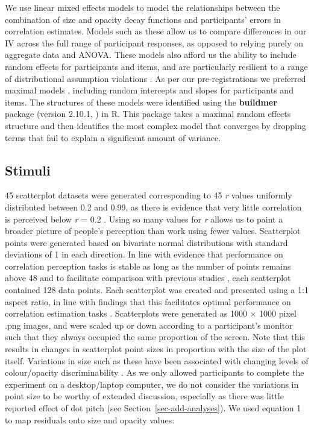 \documentclass[sigconf]{acmart}
\begin{document}
We use linear mixed effects models to model the relationships between
the combination of size and opacity decay functions and participants'
errors in correlation estimates. Models such as these allow us to
compare differences in our IV across the full range of participant
responses, as opposed to relying purely on aggregate data and ANOVA.
These models also afford us the ability to include random effects for
participants and items, and are particularly resilient to a range of
distributional assumption violations \citep{schielzeth_2020}. As per our
pre-registrations we preferred maximal models \citep{barr_2013},
including random intercepts and slopes for participants and items. The
structures of these models were identified using the \textbf{buildmer}
package (version 2.10.1, \citep{voeten_buildmer}) in R. This package
takes a maximal random effects structure and then identifies the most
complex model that converges by dropping terms that fail to explain a
significant amount of variance.

\hypertarget{sec-scatter-gen}{%
\subsection{Stimuli}\label{sec-scatter-gen}}

45 scatterplot datasets were generated corresponding to 45 \emph{r}
values uniformly distributed between 0.2 and 0.99, as there is evidence
that very little correlation is perceived below \emph{r} = 0.2
\citep{strahan_1978, bobko_1979, cleveland_1982}. Using so many values
for \emph{r} allows us to paint a broader picture of people's perception
than work using fewer values. Scatterplot points were generated based on
bivariate normal distributions with standard deviations of 1 in each
direction. In line with evidence that performance on correlation
perception tasks is stable as long as the number of points remains above
48 \citep{rensink_2014} and to facilitate comparison with previous
studies \citep{strain_2023, strain_2023b}, each scatterplot contained
128 data points. Each scatterplot was created and presented using a 1:1
aspect ratio, in line with findings that this facilitates optimal
performance on correlation estimation tasks \citep{micallef_2017}.
Scatterplots were generated as 1000 \(\times\) 1000 pixel .png images,
and were scaled up or down according to a participant's monitor such
that they always occupied the same proportion of the screen. Note that
this results in changes in scatterplot point sizes in proportion with
the size of the plot itself. Variations in size such as these have been
associated with changing levels of colour/opacity discriminability
\citep{szafir_2018, smart_2019}. As we only allowed participants to
complete the experiment on a desktop/laptop computer, we do not consider
the variations in point size to be worthy of extended discussion,
especially as there was little reported effect of dot pitch (see
Section~\ref{sec-add-analyses}). We used equation 1 to map residuals
onto size and opacity values:
\end{document}
